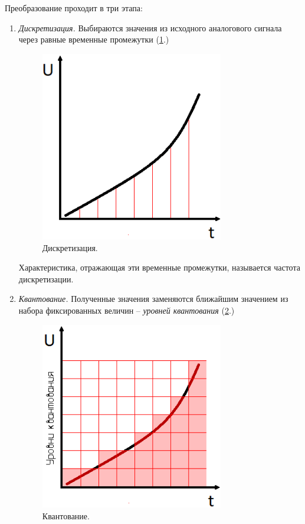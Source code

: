 \documentclass[a4paper,twoside]{book}
\begin{document}
Преобразование проходит в три этапа:
\begin{enumerate}
\item \emph{Дискретизация.} Выбираются значения из исходного аналогового сигнала через
  равные временные промежутки (\ref{fig:discretization}.)

  \begin{figure}[h]
    \caption{Дискретизация.}
    \label{fig:discretization}
    \includegraphics[width=8cm]{discretization}
    \centering
  \end{figure}

  Характеристика, отражающая эти временные промежутки, называется частота
  дискретизации.
\item \emph{Квантование.} Полученные значения заменяются ближайшим значением из
  набора фиксированных величин -- \emph{уровней квантования}
  (\ref{fig:quantization}.)

  \begin{figure}[h]
    \caption{Квантование.}
    \label{fig:quantization}
    \includegraphics[width=8cm]{quantization}
    \centering
  \end{figure}


\end{enumerate}
\end{document}
